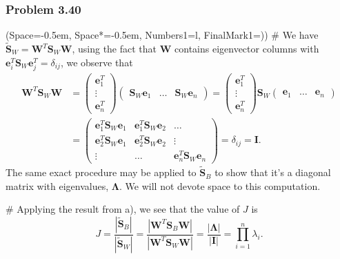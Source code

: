 \documentclass[12pt, a4paper]{article}
\newcommand{\listSpace}{-0.5em}%
\newcommand{\vect}[1]{\bm{#1}}
\newcommand{\abs}[1]{\left\lvert#1\right\rvert}
\begin{document}
\subsubsection*{Problem 3.40}
\begin{easylist}[enumerate]
\ListProperties(Space=\listSpace, Space*=\listSpace, Numbers1=l, FinalMark1={)})
# We have $\tilde{\vect{S}}_W = \vect{W}^T \vect{S}_W \vect{W}$, using the fact that $\vect{W}$ contains eigenvector columns with $\vect{e}^T_i \vect{S}_W \vect{e}^T_j = \delta_{ij}$, we observe that 
\begin{align*}
\vect{W}^T \vect{S}_W \vect{W}
& =
\begin{pmatrix}
\vect{e}_1^T \\ 
\vdots \\ 
\vect{e}_n^T
\end{pmatrix}
\begin{pmatrix}
\vect{S}_W\vect{e}_1 & \dots & \vect{S}_W\vect{e}_n
\end{pmatrix}
=
	\begin{pmatrix}
	\vect{e}_1^T \\ 
	\vdots \\ 
	\vect{e}_n^T
	\end{pmatrix}
	\vect{S}_W
	\begin{pmatrix}
	\vect{e}_1 & \dots & \vect{e}_n
	\end{pmatrix} \\
	&=
	\begin{pmatrix}
	\vect{e}_1^T \vect{S}_W \vect{e}_1 & \vect{e}_1^T \vect{S}_W \vect{e}_2 & \dots \\ 
	\vect{e}_2^T \vect{S}_W \vect{e}_1 & \vect{e}_2^T \vect{S}_W \vect{e}_2 & \vdots \\ 
	\vdots & \dots & \vect{e}_n^T \vect{S}_W \vect{e}_n
	\end{pmatrix}
	= \delta_{ij} = \vect{I}.
\end{align*}
The same exact procedure may be applied to $\tilde{\vect{S}}_B$ to show that it's a diagonal matrix with eigenvalues, $\vect{\Lambda}$. 
We will not devote space to this computation.

# Applying the result from a), we see that the value of $J$ is
\begin{equation*}
	J = \frac{\abs{\tilde{\vect{S}}_B}}{\abs{\tilde{\vect{S}}_W}}
	= \frac{\abs{\vect{W}^T \vect{S}_B \vect{W}}}{\abs{\vect{W}^T \vect{S}_W \vect{W}}}
	=
	\frac{\abs{\vect{\Lambda}}}{\abs{\vect{I}}} = \prod_{i = 1}^{n} \lambda_i.
\end{equation*}


\end{easylist}
\end{document}
